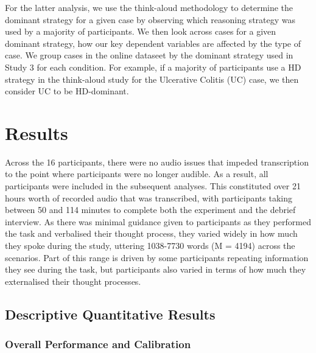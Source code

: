 \documentclass[a4paper, nobind]{templates/ociamthesis}
\begin{document}
For the latter analysis, we use the think-aloud methodology to determine the dominant strategy for a given case by observing which reasoning strategy was used by a majority of participants. We then look across cases for a given dominant strategy, how our key dependent variables are affected by the type of case. We group cases in the online dataseet by the dominant strategy used in Study 3 for each condition. For example, if a majority of participants use a HD strategy in the think-aloud study for the Ulcerative Colitis (UC) case, we then consider UC to be HD-dominant.

\section*{Results}\label{results-2}

Across the 16 participants, there were no audio issues that impeded transcription to the point where participants were no longer audible. As a result, all participants were included in the subsequent analyses. This constituted over 21 hours worth of recorded audio that was transcribed, with participants taking between 50 and 114 minutes to complete both the experiment and the debrief interview. As there was minimal guidance given to participants as they performed the task and verbalised their thought process, they varied widely in how much they spoke during the study, uttering 1038-7730 words (M = 4194) across the scenarios. Part of this range is driven by some participants repeating information they see during the task, but participants also varied in terms of how much they externalised their thought processes.

\subsection*{Descriptive Quantitative Results}\label{descriptive-quantitative-results}

\subsubsection*{Overall Performance and Calibration}\label{overall-performance-and-calibration-1}
\end{document}
